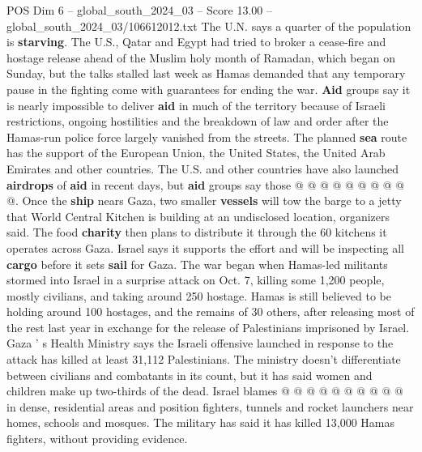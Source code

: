 \begin{textsample}{POS Dim 6 – global\_south\_2024\_03 – Score 13.00 – global\_south\_2024\_03/106612012.txt}
The U.N. says a quarter of the population is \textbf{starving}.
The U.S., Qatar and Egypt had tried to broker a cease-fire and hostage release ahead of the Muslim holy month of Ramadan, which began on Sunday, but the talks stalled last week as Hamas demanded that any temporary pause in the fighting come with guarantees for ending the war. \textbf{Aid} groups say it is nearly impossible to deliver \textbf{aid} in much of the territory because of Israeli restrictions, ongoing hostilities and the breakdown of law and order after the Hamas-run police force largely vanished from the streets.
The planned \textbf{sea} route has the support of the European Union, the United States, the United Arab Emirates and other countries.
The U.S. and other countries have also launched \textbf{airdrops} of \textbf{aid} in recent days, but \textbf{aid} groups say those @ @ @ @ @ @ @ @ @ @.
Once the \textbf{ship} nears Gaza, two smaller \textbf{vessels} will tow the barge to a jetty that World Central Kitchen is building at an undisclosed location, organizers said.
The food \textbf{charity} then plans to distribute it through the 60 kitchens it operates across Gaza.
Israel says it supports the effort and will be inspecting all \textbf{cargo} before it sets \textbf{sail} for Gaza.
The war began when Hamas-led militants stormed into Israel in a surprise attack on Oct. 7, killing some 1,200 people, mostly civilians, and taking around 250 hostage.
Hamas is still believed to be holding around 100 hostages, and the remains of 30 others, after releasing most of the rest last year in exchange for the release of Palestinians imprisoned by Israel.
Gaza ' s Health Ministry says the Israeli offensive launched in response to the attack has killed at least 31,112 Palestinians.
The ministry doesn't differentiate between civilians and combatants in its count, but it has said women and children make up two-thirds of the dead.
Israel blames @ @ @ @ @ @ @ @ @ @ in dense, residential areas and position fighters, tunnels and rocket launchers near homes, schools and mosques.
The military has said it has killed 13,000 Hamas fighters, without providing evidence.

\end{textsample}
